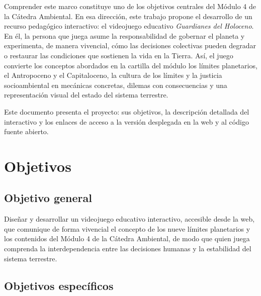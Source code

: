 \documentclass[12pt,a4paper]{article}
\begin{document}
Comprender este marco constituye uno de los objetivos centrales del M\'{o}dulo 4 de la C\'{a}tedra Ambiental. En esa direcci\'{o}n, este trabajo propone el desarrollo de un recurso pedag\'{o}gico interactivo: el videojuego educativo \emph{Guardianes del Holoceno}. En \'{e}l, la persona que juega asume la responsabilidad de gobernar el planeta y experimenta, de manera vivencial, c\'{o}mo las decisiones colectivas pueden degradar o restaurar las condiciones que sostienen la vida en la Tierra. As\'{i}, el juego convierte los conceptos abordados en la cartilla del m\'{o}dulo los l\'{i}mites planetarios, el Antropoceno y el Capitaloceno, la cultura de los l\'{i}mites y la justicia socioambiental en mec\'{a}nicas concretas, dilemas con consecuencias y una representaci\'{o}n visual del estado del sistema terrestre.

Este documento presenta el proyecto: sus objetivos, la descripci\'{o}n detallada del interactivo y los enlaces de acceso a la versi\'{o}n desplegada en la web y al c\'{o}digo fuente abierto.

\section*{Objetivos}

\subsection*{Objetivo general}

Dise\~{n}ar y desarrollar un videojuego educativo interactivo, accesible desde la web, que comunique de forma vivencial el concepto de los nueve l\'{i}mites planetarios y los contenidos del M\'{o}dulo 4 de la C\'{a}tedra Ambiental, de modo que quien juega comprenda la interdependencia entre las decisiones humanas y la estabilidad del sistema terrestre.

\subsection*{Objetivos espec\'{i}ficos}
\end{document}
